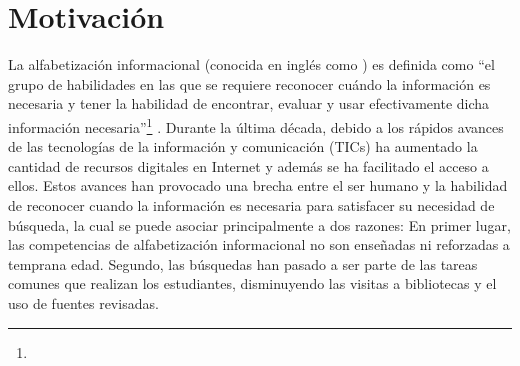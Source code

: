 \section{Motivación}
\label{sec:motivacion}



La alfabetización informacional (conocida en inglés como ) es definida como “el grupo de habilidades en las que se requiere reconocer cuándo la información es necesaria y tener la habilidad de encontrar, evaluar y usar efectivamente dicha información necesaria”\footnote{\traduccionlibre} \parencite[p.~2]{american2000information}. Durante la última década, debido a los rápidos avances de las tecnologías de la información y comunicación (TICs) ha aumentado la cantidad de recursos digitales en Internet y además se ha facilitado el acceso a ellos. Estos avances han provocado una brecha entre el ser humano y la habilidad de reconocer cuando la información es necesaria para satisfacer su necesidad de búsqueda, la cual se puede asociar principalmente a dos razones: En primer lugar, las competencias de alfabetización informacional no son enseñadas ni reforzadas a temprana edad. Segundo, las búsquedas  han pasado a ser parte de las tareas comunes que realizan los estudiantes, disminuyendo las visitas a bibliotecas y el uso de fuentes revisadas.

